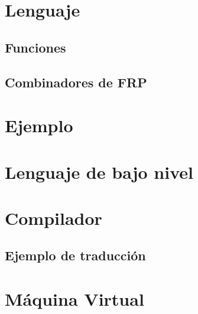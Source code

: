 


\section{Lenguaje \frob{}}


  \subsection{Funciones}
  
  \subsection{Combinadores de FRP}
  

\section{Ejemplo}


\section{Lenguaje de bajo nivel}


\section{Compilador}

\subsection{Ejemplo de traducción}


\section{Máquina Virtual}


